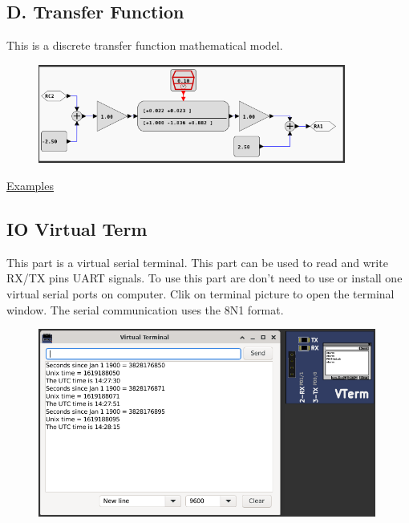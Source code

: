 \subsection{D. Transfer Function}

This is a discrete transfer function mathematical model. 

\begin{figure}[H]
\center
\includegraphics[width=0.9\textwidth]{img/part_dtransferf.png} 
\end{figure} 

\href{https://lcgamboa.github.io/picsimlab_examples/parts_D._Transfer_Function.html}{Examples}

\subsection{IO Virtual Term} \hypertarget{def:vterm}{}

This part is a virtual serial terminal. This part can be used to read and write RX/TX pins UART signals.
To use this part are don't need to use or install one virtual serial ports on computer.  
Clik on terminal picture to open the terminal window.
The serial communication uses the 8N1 format.

\begin{figure}[H]
\center
\includegraphics[width=0.99\textwidth]{img/part_vterm.png} 
\end{figure} 

